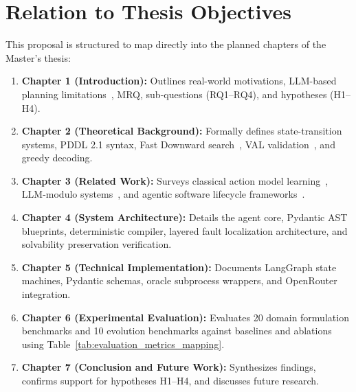 \documentclass[11pt,a4paper]{article}
\begin{document}
\section{Relation to Thesis Objectives}
This proposal is structured to map directly into the planned chapters of the Master's thesis:
\begin{enumerate}[label=(\arabic*), nosep, leftmargin=2.2em]
    \item \textbf{Chapter 1 (Introduction):} Outlines real-world motivations, LLM-based planning limitations~\cite{kambhampati2024llmscantplanhelp}, MRQ, sub-questions (RQ1--RQ4), and hypotheses (H1--H4).
    \item \textbf{Chapter 2 (Theoretical Background):} Formally defines state-transition systems, PDDL 2.1 syntax, Fast Downward search~\cite{Helmert_2006}, VAL validation~\cite{howey2004val}, and greedy decoding.
    \item \textbf{Chapter 3 (Related Work):} Surveys classical action model learning~\cite{aineto2019learningstripsactionmodels}, LLM-modulo systems~\cite{kambhampati2024llmscantplanhelp}, and agentic software lifecycle frameworks~\cite{georgievski2026from, Applis}.
    \item \textbf{Chapter 4 (System Architecture):} Details the agent core, Pydantic AST blueprints, deterministic compiler, layered fault localization architecture, and solvability preservation verification.
    \item \textbf{Chapter 5 (Technical Implementation):} Documents LangGraph state machines, Pydantic schemas, oracle subprocess wrappers, and OpenRouter integration.
    \item \textbf{Chapter 6 (Experimental Evaluation):} Evaluates 20 domain formulation benchmarks and 10 evolution benchmarks against baselines and ablations using Table~\ref{tab:evaluation_metrics_mapping}.
    \item \textbf{Chapter 7 (Conclusion and Future Work):} Synthesizes findings, confirms support for hypotheses H1--H4, and discusses future research.
\end{enumerate}



\end{document}
